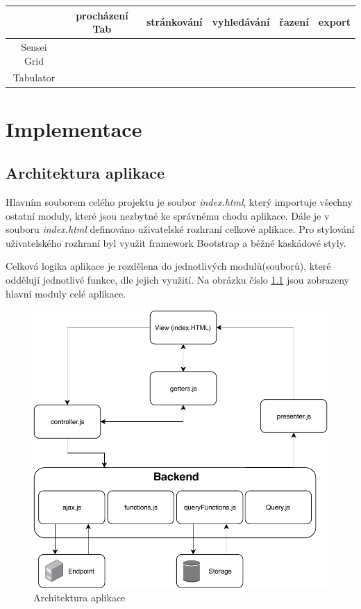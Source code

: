 \documentclass[
12pt,
a4paper,
pdftex,
czech,
titlepage
]{report}
\newcommand{\cmark}{\ding{51}}
\newcommand{\xmark}{\ding{55}}
\begin{document}
\begin{center}
	\begin{tabular}{ | c || c | c | c | c | c | }
		\hline
		& procházení Tab & stránkování  & vyhledávání & řazení & export\\ \hline
		Sensei Grid & \cmark & \xmark &\xmark & \xmark & \xmark \\
		Tabulator & \cmark & \cmark & \cmark & \cmark & \cmark \\
		\hline
	\end{tabular}
\end{center}

\chapter{Implementace}
\section{Architektura aplikace}
Hlavním souborem celého projektu je soubor \textit{index.html}, který importuje všechny ostatní moduly, které jsou nezbytné ke správnému chodu aplikace. Dále je v souboru \textit{index.html} definováno uživatelské rozhraní celkové aplikace. Pro stylování uživatelského rozhraní byl využit framework Bootstrap a běžné kaskádové styly.
\par
Celková logika aplikace je rozdělena do jednotlivých modulů(souborů), které oddělují jednotlivé funkce, dle jejich využití. Na obrázku číslo \ref{img_arch} jsou zobrazeny hlavní moduly celé aplikace.
\begin{figure}[h]
	\centering
	\includegraphics[scale=0.7]{img/SparqlRepositoryArchitecture.pdf}
	\caption{Architektura aplikace}
	\label{img_arch}
\end{figure}
\end{document}
